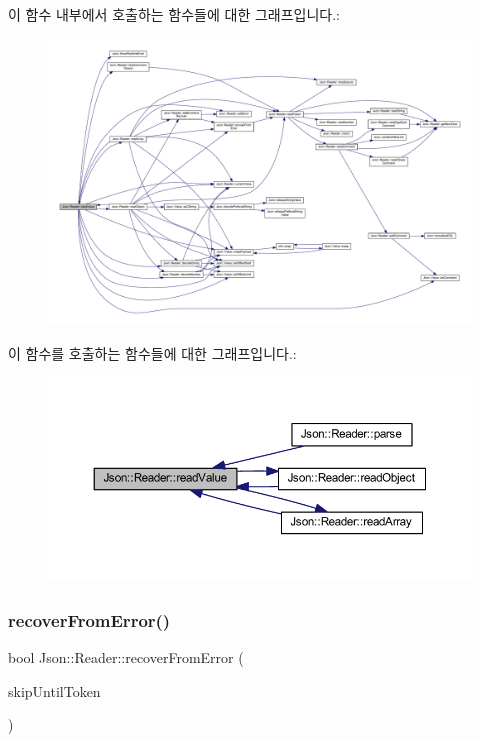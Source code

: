 이 함수 내부에서 호출하는 함수들에 대한 그래프입니다.\+:\nopagebreak
\begin{figure}[H]
\begin{center}
\leavevmode
\includegraphics[width=350pt]{class_json_1_1_reader_a47e56844b803d41ec993a83fadf4495c_cgraph}
\end{center}
\end{figure}
이 함수를 호출하는 함수들에 대한 그래프입니다.\+:\nopagebreak
\begin{figure}[H]
\begin{center}
\leavevmode
\includegraphics[width=350pt]{class_json_1_1_reader_a47e56844b803d41ec993a83fadf4495c_icgraph}
\end{center}
\end{figure}
\mbox{\label{class_json_1_1_reader_a8d4ed03a43082c5ace81ba5b81425eaf}} 
\subsubsection{\texorpdfstring{recover\+From\+Error()}{recoverFromError()}}
{\footnotesize\ttfamily bool Json\+::\+Reader\+::recover\+From\+Error (\begin{DoxyParamCaption}\item[{\hyperlink{class_json_1_1_reader_aa35e6ab574dc399a0a645ad98ed66bc9}{Token\+Type}}]{skip\+Until\+Token }\end{DoxyParamCaption})\hspace{0.3cm}{\ttfamily [private]}}



